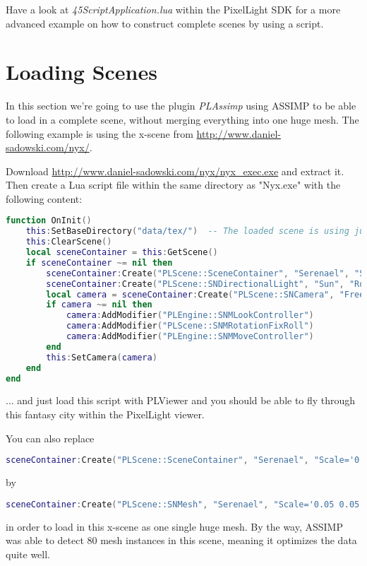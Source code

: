 Have a look at \emph{45ScriptApplication.lua} within the PixelLight \ac{SDK} for a more advanced example on how to construct complete scenes by using a script.




\section{Loading Scenes}
In this section we're going to use the plugin \emph{PLAssimp} using \ac{ASSIMP} to be able to load in a complete scene, without merging everything into one huge mesh. The following example is using the x-scene from \url{http://www.daniel-sadowski.com/nyx/}.

Download \url{http://www.daniel-sadowski.com/nyx/nyx_exec.exe} and extract it. Then create a Lua script file within the same directory as "Nyx.exe" with the following content:
\begin{lstlisting}[language=lua]
function OnInit()
	this:SetBaseDirectory("data/tex/")	-- The loaded scene is using just texture names like "Houses"
	this:ClearScene()
	local sceneContainer = this:GetScene()
	if sceneContainer ~= nil then
		sceneContainer:Create("PLScene::SceneContainer", "Serenael", "Scale='0.05 0.05 0.05' Filename='data/msh/serenael.x'")
		sceneContainer:Create("PLScene::SNDirectionalLight", "Sun", "Rotation='45 0 0'")
		local camera = sceneContainer:Create("PLScene::SNCamera", "FreeCamera")
		if camera ~= nil then
			camera:AddModifier("PLEngine::SNMLookController")
			camera:AddModifier("PLScene::SNMRotationFixRoll")
			camera:AddModifier("PLEngine::SNMMoveController")
		end
		this:SetCamera(camera)
	end
end
\end{lstlisting}
... and just load this script with PLViewer and you should be able to fly through this fantasy city within the PixelLight viewer.

You can also replace
\begin{lstlisting}[language=lua]
sceneContainer:Create("PLScene::SceneContainer", "Serenael", "Scale='0.05 0.05 0.05' Filename='data/msh/serenael.x'")
\end{lstlisting}
by
\begin{lstlisting}[language=lua]
sceneContainer:Create("PLScene::SNMesh", "Serenael", "Scale='0.05 0.05 0.05' Mesh='data/msh/serenael.x'")
\end{lstlisting}
in order to load in this x-scene as one single huge mesh. By the way, \ac{ASSIMP} was able to detect 80 mesh instances in this scene, meaning it optimizes the data quite well.


